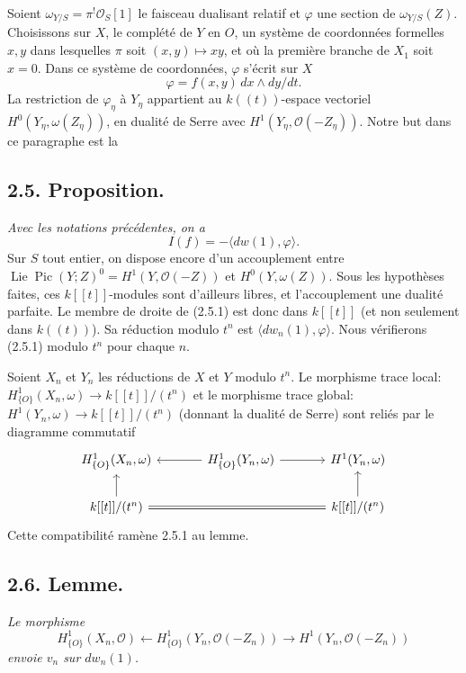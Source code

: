 \documentclass[11pt]{article}
\DeclareMathOperator{\Lie}{Lie}
\DeclareMathOperator{\Pic}{Pic}
\newcommand{\OO}{\mathcal O}
\begin{document}
Soient $\omega_{Y/S}=\pi^!\OO_S[1]$ le faisceau dualisant relatif et $\varphi$ une section de $\omega_{Y/S}(Z)$. Choisissons sur $X$, le complété de $Y$ en $O$, un système de coordonnées formelles $x,y$ dans lesquelles $\pi$ soit $(x,y)\mapsto xy$, et où la première branche de $X_1$ soit $x=0$. Dans ce système de coordonnées, $\varphi$ s'écrit sur $X$
\[
        \varphi=f(x,y)\,dx\wedge dy/dt.
\]
La restriction de $\varphi_\eta$ à $Y_\eta$ appartient au $k((t))$-espace vectoriel $H^0(Y_\eta,\omega(Z_\eta))$, en dualité de Serre avec $H^1(Y_\eta,\OO(-Z_\eta))$. Notre but dans ce paragraphe est la

\subsection*{2.5. Proposition.}
\emph{Avec les notations précédentes, on a}
\begin{equation}
        I(f)=-\langle dw(1),\varphi\rangle. \tag{2.5.1}
\end{equation}
Sur $S$ tout entier, on dispose encore d'un accouplement entre $\Lie\Pic(Y;Z)^0=H^1(Y,\OO(-Z))$ et $H^0(Y,\omega(Z))$. Sous les hypothèses faites, ces $k[[t]]$-modules sont d'ailleurs libres, et l'accouplement une dualité parfaite. Le membre de droite de (2.5.1) est donc dans $k[[t]]$ (et non seulement dans $k((t))$). Sa réduction modulo $t^n$ est $\langle dw_n(1),\varphi\rangle$. Nous vérifierons (2.5.1) modulo $t^n$ pour chaque $n$.

Soient $X_n$ et $Y_n$ les réductions de $X$ et $Y$ modulo $t^n$. Le morphisme trace local: $H^1_{\{O\}}(X_n,\omega)\to k[[t]]/(t^n)$ et le morphisme trace global: $H^1(Y_n,\omega)\to k[[t]]/(t^n)$ (donnant la dualité de Serre) sont reliés par le diagramme commutatif
\[
\begin{tikzcd}[column sep=large]
H^1_{\{O\}}(X_n,\omega) & H^1_{\{O\}}(Y_n,\omega) \arrow[l] \arrow[r] & H^1(Y_n,\omega) \\
k[[t]]/(t^n) \arrow[u] \arrow[rr,equal] & & k[[t]]/(t^n) \arrow[u]
\end{tikzcd}
\]
Cette compatibilité ramène 2.5.1 au lemme.

\subsection*{2.6. Lemme.}
\emph{Le morphisme}
\[
        H^1_{\{O\}}(X_n,\OO)\longleftarrow H^1_{\{O\}}(Y_n,\OO(-Z_n))\longrightarrow H^1(Y_n,\OO(-Z_n))
\]
\emph{envoie $v_n$ sur $dw_n(1)$.}
\end{document}
